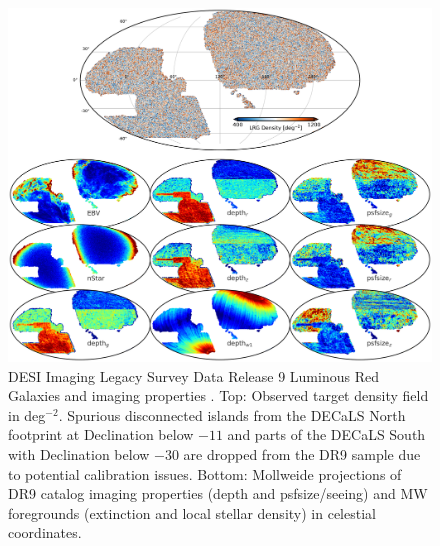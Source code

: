\begin{figure}
    \centering
    \includegraphics[width=\textwidth]{figures/dr9data.pdf}
    \caption{DESI Imaging Legacy Survey Data Release 9 Luminous Red Galaxies and imaging properties \citep{dey2018overview}. Top: Observed target density field in deg$^{-2}$. Spurious disconnected islands from the DECaLS North footprint at Declination below $-11$ and parts of the DECaLS South with Declination below $-30$ are dropped from the DR9 sample due to potential calibration issues. Bottom: Mollweide projections of DR9 catalog imaging properties (depth and psfsize/seeing) and MW foregrounds (extinction and local stellar density) in celestial coordinates.}
    \label{fig:ng}
\end{figure}

